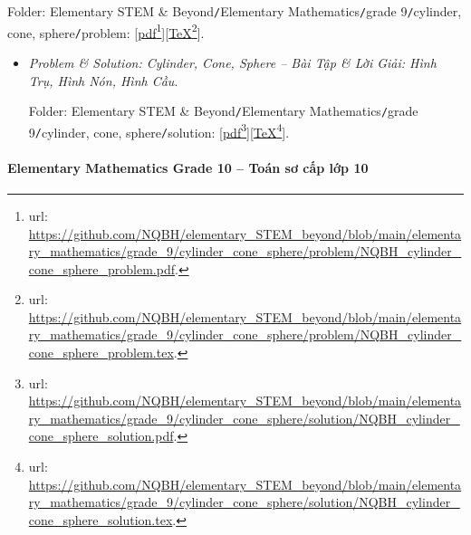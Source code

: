 \documentclass[12pt]{article}
\begin{document}
\begin{enumerate}
\begin{center}
	\end{center}
	Folder: {\sf Elementary STEM \& Beyond{\tt/}Elementary Mathematics{\tt/}grade 9{\tt/}cylinder, cone, sphere{\tt/}problem}: [\href{https://github.com/NQBH/elementary_STEM_beyond/blob/main/elementary_mathematics/grade_9/cylinder_cone_sphere/problem/NQBH_cylinder_cone_sphere_problem.pdf}{pdf}\footnote{{\sc url}: \url{https://github.com/NQBH/elementary_STEM_beyond/blob/main/elementary_mathematics/grade_9/cylinder_cone_sphere/problem/NQBH_cylinder_cone_sphere_problem.pdf}.}][\href{https://github.com/NQBH/elementary_STEM_beyond/blob/main/elementary_mathematics/grade_9/cylinder_cone_sphere/problem/NQBH_cylinder_cone_sphere_problem.tex}{\TeX}\footnote{{\sc url}: \url{https://github.com/NQBH/elementary_STEM_beyond/blob/main/elementary_mathematics/grade_9/cylinder_cone_sphere/problem/NQBH_cylinder_cone_sphere_problem.tex}.}].
	\begin{itemize}
		\item  {\it Problem \& Solution: Cylinder, Cone, Sphere -- Bài Tập \& Lời Giải: Hình Trụ, Hình Nón, Hình Cầu}.
		
		Folder: {\sf Elementary STEM \& Beyond{\tt/}Elementary Mathematics{\tt/}grade 9{\tt/}cylinder, cone, sphere{\tt/}solution}: [\href{https://github.com/NQBH/elementary_STEM_beyond/blob/main/elementary_mathematics/grade_9/cylinder_cone_sphere/solution/NQBH_cylinder_cone_sphere_solution.pdf}{pdf}\footnote{{\sc url}: \url{https://github.com/NQBH/elementary_STEM_beyond/blob/main/elementary_mathematics/grade_9/cylinder_cone_sphere/solution/NQBH_cylinder_cone_sphere_solution.pdf}.}][\href{https://github.com/NQBH/elementary_STEM_beyond/blob/main/elementary_mathematics/grade_9/cylinder_cone_sphere/solution/NQBH_cylinder_cone_sphere_solution.tex}{\TeX}\footnote{{\sc url}: \url{https://github.com/NQBH/elementary_STEM_beyond/blob/main/elementary_mathematics/grade_9/cylinder_cone_sphere/solution/NQBH_cylinder_cone_sphere_solution.tex}.}].
	\end{itemize}
\end{enumerate}

\paragraph{Elementary Mathematics Grade 10 -- Toán sơ cấp lớp 10}
\end{document}
